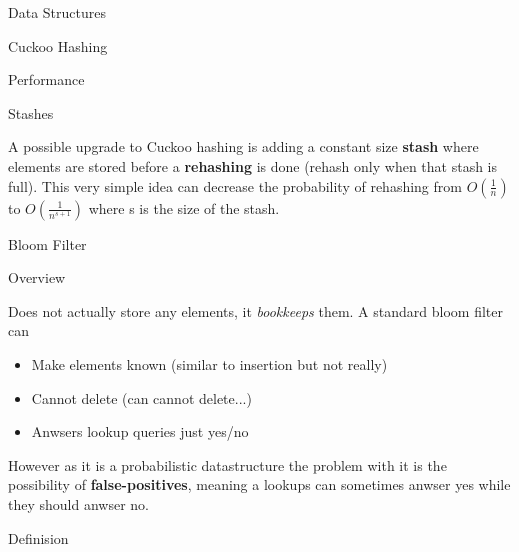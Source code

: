 \documentclass[12pt, letterpaper]{article}
\begin{document}
\begin{section}{Data Structures}
\begin{subsection}{Cuckoo Hashing}
\begin{subsubsection}{Performance}
    \end{subsubsection}

    \begin{subsubsection}{Stashes}

      A possible upgrade to Cuckoo hashing is adding a constant size
      \textbf{stash} where elements are stored before a \textbf{rehashing} is
      done (rehash only when that stash is full). This very simple idea can
      decrease the probability of rehashing from \(O(\frac{1}{n})\) to
      \(O(\frac{1}{n^{s + 1}})\) where s is the size of the stash.

    \end{subsubsection}

  \end{subsection}

  \begin{subsection}{Bloom Filter}

    \begin{subsubsection}{Overview}

      Does not actually store any elements, it \textit{bookkeeps} them.
      A standard bloom filter can
      \begin{itemize}
        \item Make elements known (similar to insertion but not really)
        \item Cannot delete (can cannot delete...)
        \item Anwsers lookup queries just yes/no
      \end{itemize}

      However as it is a probabilistic datastructure the problem with it is the
      possibility of \textbf{false-positives}, meaning a lookups can sometimes
      anwser yes  while they should anwser no.

    \end{subsubsection}

    \begin{subsubsection}{Definision}


\end{subsubsection}
\end{subsection}
\end{section}
\end{document}
